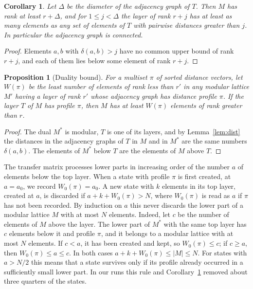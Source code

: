 \documentclass[11pt]{amsart}
\newtheorem{proposition}[theorem]{Proposition}
\newtheorem{corollary}[theorem]{Corollary}
\theoremstyle{definition}
\theoremstyle{remark}
\begin{document}
\begin{corollary}\label{cor:layers}
Let $\Delta$ be the diameter of the adjacency graph of $T$.  Then $M$ has rank at least
$r + \Delta$, and for $1 \le j < \Delta$ the layer of rank $r+j$ has at least as many
elements as any set of elements of $T$ with pairwise distances greater than $j$.  In
particular the adjacency graph is connected.
\end{corollary}

\begin{proof}
Elements $a,b$ with $\delta(a,b) > j$ have no common upper bound of rank $r+j$, and each of
them lies below some element of rank $r+j$.
\end{proof}

\begin{proposition}[Duality bound]\label{prop:dual}
For a multiset $\pi$ of sorted distance vectors, let $W(\pi)$ be the least number of
elements of rank less than $r'$ in any modular lattice $M'$ having a layer of rank $r'$
whose adjacency graph has distance profile $\pi$.  If the layer $T$ of $M$ has
profile $\pi$, then $M$ has at least $W(\pi)$ elements of rank greater than $r$.
\end{proposition}

\begin{proof}
The dual $M^*$ is modular, $T$ is one of its layers, and by Lemma~\ref{lem:dist} the
distances in the adjacency graphs of $T$ in $M$ and in $M^*$ are the same numbers
$\delta(a,b)$.  The elements of $M^*$ below $T$ are the elements of $M$ above $T$.
\end{proof}

The transfer matrix processes lower parts in increasing order of the number $a$ of
elements below the top layer.  When a state with profile $\pi$ is first created, at
$a = a_0$, we record $W_0(\pi) = a_0$.  A new state with $k$ elements in its top layer,
created at $a$, is discarded if $a + k + W_0(\pi) > N$, where $W_0(\pi)$ is read as
$a$ if $\pi$ has not been recorded.  By induction on $a$ this never discards the lower
part of a modular lattice $M$ with at most $N$ elements.  Indeed, let $c$ be the number of
elements of $M$ above the layer.  The lower part of $M^*$ with the same top layer has $c$ elements
below it and profile $\pi$, and it belongs to a modular lattice with at most $N$
elements.  If $c < a$, it has been created and kept, so $W_0(\pi) \le c$; if $c \ge a$,
then $W_0(\pi) \le a \le c$.  In both cases $a + k + W_0(\pi) \le |M| \le N$.  For
states with $a > N/2$ this means that a state survives only if its profile already
occurred in a sufficiently small lower part.  In our runs this rule and
Corollary~\ref{cor:layers} removed about three quarters of the states.
\end{document}
